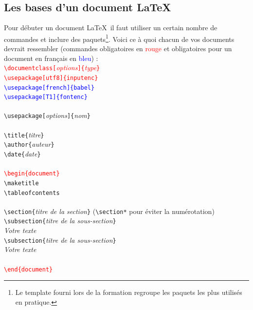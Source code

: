 \documentclass[11pt]{article}				%
\newcommand{\tb}{\textbackslash}
\newcommand{\cmdo}[3][]{\texttt{\textbackslash #2}\texttt{[#1}\texttt{]\{#3\}}}
\newcommand{\cmdoi}[3][]{\texttt{\textbackslash #2}\texttt{[}\textit{#1}\texttt{]\{}\textit{#3}\texttt{\}}}
\newcommand{\cmd}[2]{\texttt{\textbackslash #1}\texttt{\{#2\}}}
\newcommand{\cmdi}[2]{\texttt{\textbackslash #1}\texttt{\{}\textit{#2}\texttt{\}}}
\begin{document}
\newpage

\subsection*{Les bases d'un document \LaTeX}


\noindent Pour débuter un document \LaTeX \ il faut utiliser un certain nombre de commandes et inclure des paquets\footnote{Le template fourni lors de la formation regroupe les paquets les plus utilisés en pratique.}. Voici ce à quoi chacun de vos documents devrait ressembler (commandes obligatoires en \textcolor{red}{rouge} et obligatoires pour un document en français en \textcolor{blue}{bleu}) : \\

\noindent
\textcolor{red}{\cmdoi[options]{documentclass}{type}} \\
\textcolor{red}{\cmdo[utf8]{usepackage}{inputenc}} \\
\textcolor{blue}{\cmdo[french]{usepackage}{babel}} \\
\textcolor{blue}{\cmdo[T1]{usepackage}{fontenc}} \\
~\\
\cmdoi[options]{usepackage}{nom} \\
~\\ 
\cmdi{title}{titre} \\
\cmdi{author}{auteur} \\
\cmdi{date}{date} \\
~\\ 
\textcolor{red}{\cmd{begin}{document}}\\
\texttt{\tb maketitle} \\
\texttt{\tb tableofcontents} \\
~\\
\cmdi{section}{titre de la section} \quad (\texttt{\tb section*} pour éviter la numérotation)	 \\
\cmdi{subsection}{titre de la sous-section} \\
\textit{Votre texte}\\

\cmdi{subsection}{titre de la sous-section} \\
\textit{Votre texte} \\
~\\
\textcolor{red}{\texttt{\tb end\{document\}}} \\
\end{document}
